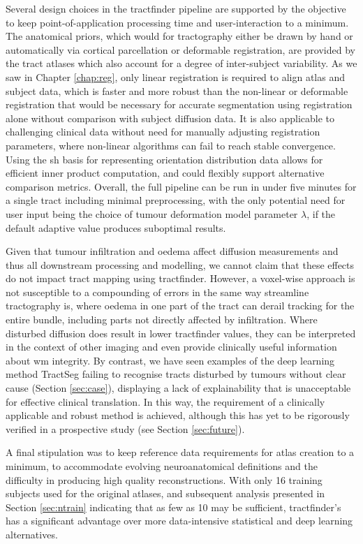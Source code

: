 Several design choices in the tractfinder pipeline are supported by the objective to keep point-of-application processing time and user-interaction to a minimum.
The anatomical priors, which would for tractography either be drawn by hand or automatically via cortical parcellation or deformable registration, are provided by the tract atlases which also account for a degree of inter-subject variability.
As we saw in Chapter \ref{chap:reg}, only linear registration is required to align atlas and subject data, which is faster and more robust than the non-linear or deformable registration that would be necessary for accurate segmentation using registration alone without comparison with subject diffusion data.
It is also applicable to challenging clinical data without need for manually adjusting registration parameters, where non-linear algorithms can fail to reach stable convergence.
Using the \gls{sh} basis for representing orientation distribution data allows for efficient inner product computation, and could flexibly support alternative comparison metrics.
Overall, the full pipeline can be run in under five minutes for a single tract including minimal preprocessing, with the only potential need for user input being the choice of tumour deformation model parameter $\lambda$, if the default adaptive value produces suboptimal results.

Given that tumour infiltration and oedema affect diffusion measurements and thus all downstream processing and modelling, we cannot claim that these effects do not impact tract mapping using tractfinder.
However, a voxel-wise approach is not susceptible to a compounding of errors in the same way streamline tractography is, where oedema in one part of the tract can derail tracking for the entire bundle, including parts not directly affected by infiltration.
Where disturbed diffusion does result in lower tractfinder values, they can be interpreted in the context of other imaging and even provide clinically useful information about \gls{wm} integrity.
By contrast, we have seen examples of the deep learning method TractSeg failing to recognise tracts disturbed by tumours without clear cause (Section \ref{sec:case}), displaying a lack of explainability that is unacceptable for effective clinical translation.
In this way, the requirement of a clinically applicable and robust method is achieved, although this has yet to be rigorously verified in a prospective study (see Section \ref{sec:future}).

A final stipulation was to keep reference data requirements for atlas creation to a minimum, to accommodate evolving neuroanatomical definitions and the difficulty in producing high quality reconstructions.
With only 16 training subjects used for the original atlases, and subsequent analysis presented in Section \ref{sec:ntrain} indicating that as few as 10 may be sufficient, tractfinder's has a significant advantage over more data-intensive statistical and deep learning alternatives.

